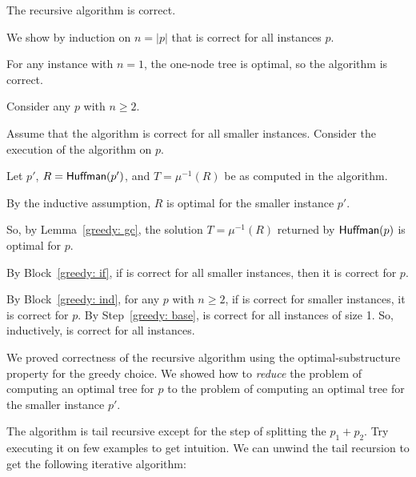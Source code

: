 \begin{lemma}
  The recursive algorithm is correct. 
\end{lemma}
\begin{longFormProof}
  \step We show by induction on $n=|p|$ that \Huffman is correct for all instances $p$.

   For any instance with $n=1$, the one-node tree is optimal, so the algorithm is correct.
  \begin{block}[greedy: ind]
    \step Consider any $p$ with $n\ge 2$.
    \begin{block}[greedy: if]
      \step Assume that the algorithm is correct for all smaller instances.
      \step Consider the execution of the algorithm on $p$.
      
      \step Let $p'$, $R= \textsf{Huffman}(p')$, and $T=\mu^{-1}(R)$
      be as computed in the algorithm.

      \step By the inductive assumption, $R$ is optimal for the smaller instance $p'$.

      \step So, by Lemma~\ref{greedy: gc}, the solution $T = \mu^{-1}(R)$
      returned by $\textsf{Huffman}(p)$ is optimal for $p$.
    \end{block}
    \step By Block~\ref{greedy: if}, 
    if \Huffman is correct for all smaller instances,
    then it is correct for $p$.
  \end{block}
  \step By Block~\ref{greedy: ind}, for any $p$ with $n\ge 2$,
  if \Huffman is correct for smaller instances,
  it is correct for $p$.
  \step By Step~\ref{greedy: base},  \Huffman is correct for all instances of size 1.
  \step So, inductively,  \Huffman is correct for all instances.
\end{longFormProof}

We proved correctness of the recursive algorithm using
the optimal-substructure property for the greedy choice.
We showed how to \emph{reduce} the problem of computing an optimal tree for $p$
to the problem of computing an optimal tree for the smaller instance $p'$.

The algorithm is tail recursive except for the step of splitting the $p_1+p_2$.
Try executing it on few examples to get intuition.
We can unwind the tail recursion to get the following iterative algorithm:

